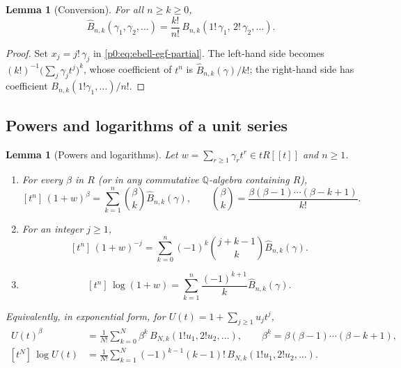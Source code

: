 \documentclass[11pt,a4paper,oneside]{book}
\theoremstyle{plain}
\newtheorem{lemma}[theorem]{Lemma}
\theoremstyle{definition}
\theoremstyle{remark}
\newcommand{\Rat}{\mathbb{Q}}
\newcommand{\Coef}[1]{[#1]\,}
\newcommand{\OB}{\widehat{B}}
\newcommand{\EB}{B}
\begin{document}
\begin{lemma}[Conversion]\label{p0:lem:bell-conversion}
For all $n\ge k\ge0$,
\begin{equation}\label{p0:eq:bell-conversion}
 \OB_{n,k}(\gamma_1,\gamma_2,\dots)
 =\frac{k!}{n!}\,\EB_{n,k}(1!\,\gamma_1,\,2!\,\gamma_2,\dots).
\end{equation}
\end{lemma}

\begin{proof}
Set $x_j=j!\,\gamma_j$ in \eqref{p0:eq:ebell-egf-partial}.  The left-hand side
becomes $(k!)^{-1}\bigl(\sum_j\gamma_jt^j\bigr)^k$, whose coefficient of $t^n$
is $\OB_{n,k}(\gamma)/k!$; the right-hand side has coefficient
$\EB_{n,k}(1!\gamma_1,\dots)/n!$.
\end{proof}

\subsection{Powers and logarithms of a unit series}

\begin{lemma}[Powers and logarithms]\label{p0:lem:power-log}
Let $w=\sum_{r\ge1}\gamma_rt^r\in tR[[t]]$ and $n\ge1$.
\begin{enumerate}
\item For every $\beta$ in $R$ (or in any commutative $\Rat$-algebra containing
      $R$),
      \begin{equation}\label{p0:eq:power-general}
       \Coef{t^n}(1+w)^{\beta}
       =\sum_{k=1}^{n}\binom{\beta}{k}\OB_{n,k}(\gamma),
       \qquad
       \binom\beta k=\frac{\beta(\beta-1)\cdots(\beta-k+1)}{k!}.
      \end{equation}
\item For an integer $j\ge1$,
      \begin{equation}\label{p0:eq:power-negative}
       \Coef{t^n}(1+w)^{-j}
       =\sum_{k=0}^{n}(-1)^{k}\binom{j+k-1}{k}\OB_{n,k}(\gamma).
      \end{equation}
\item
      \begin{equation}\label{p0:eq:log-obell}
       \Coef{t^n}\log(1+w)
       =\sum_{k=1}^{n}\frac{(-1)^{k+1}}{k}\OB_{n,k}(\gamma).
      \end{equation}
\end{enumerate}
Equivalently, in exponential form, for $U(t)=1+\sum_{j\ge1}u_jt^j$,
\begin{align}
 \Coef{t^N}U(t)^{\beta}
 &=\frac1{N!}\sum_{k=0}^{N}\beta^{\underline k}\,
   \EB_{N,k}(1!u_1,2!u_2,\dots),
 \qquad \beta^{\underline k}=\beta(\beta-1)\cdots(\beta-k+1),
 \label{p0:eq:unit-power-ebell}\\
 \Coef{t^N}\log U(t)
 &=\frac1{N!}\sum_{k=1}^{N}(-1)^{k-1}(k-1)!\,
   \EB_{N,k}(1!u_1,2!u_2,\dots).
 \label{p0:eq:log-ebell}
\end{align}
\end{lemma}
\end{document}
